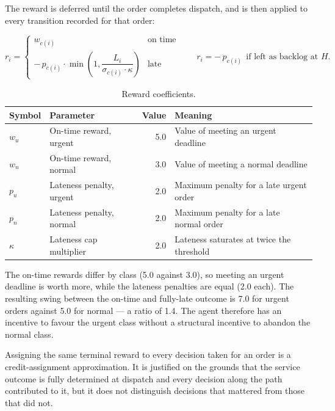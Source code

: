 The reward is deferred until the order completes dispatch, and is then applied to every
transition recorded for that order:

\begin{equation}
r_i =
\begin{cases}
w_{c(i)} & \text{on time} \\[4pt]
-\,p_{c(i)} \cdot \min\!\left(1, \dfrac{L_i}{\sigma_{c(i)} \cdot \kappa}\right) & \text{late}
\end{cases}
\qquad
r_i = -\,p_{c(i)} \ \ \text{if left as backlog at } H.
\label{eq:reward-app}
\end{equation}

\begin{table}[htbp]
\centering
\caption{Reward coefficients.}
\label{tab:rl-reward}
\small
\begin{tabularx}{0.9\textwidth}{llrX}
\toprule
\textbf{Symbol} & \textbf{Parameter} & \textbf{Value} & \textbf{Meaning} \\
\midrule
\(w_u\)      & On-time reward, urgent  & 5.0 & Value of meeting an urgent deadline \\
\(w_n\)      & On-time reward, normal  & 3.0 & Value of meeting a normal deadline \\
\(p_u\)      & Lateness penalty, urgent & 2.0 & Maximum penalty for a late urgent order \\
\(p_n\)      & Lateness penalty, normal & 2.0 & Maximum penalty for a late normal order \\
\(\kappa\)   & Lateness cap multiplier & 2.0 & Lateness saturates at twice the threshold \\
\bottomrule
\end{tabularx}
\end{table}

The on-time rewards differ by class (5.0 against 3.0), so meeting an urgent deadline is worth
more, while the lateness penalties are equal (2.0 each). The resulting swing between the on-time
and fully-late outcome is 7.0 for urgent orders against 5.0 for normal --- a ratio of
\num{1.4}. The agent therefore has an incentive to favour the urgent class without a structural
incentive to abandon the normal class.

Assigning the same terminal reward to every decision taken for an order is a credit-assignment
approximation. It is justified on the grounds that the service outcome is fully determined at
dispatch and every decision along the path contributed to it, but it does not distinguish
decisions that mattered from those that did not.


